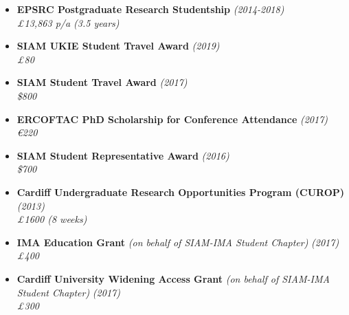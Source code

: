 \documentclass[11pt,a4paper,sans]{moderncv}        %
\begin{document}
\begin{itemize}

\item \textbf{EPSRC Postgraduate Research Studentship} \textit{(2014-2018)} \\
\textit{£13,863 p/a (3.5 years)}

\vspace{6pt}

\item \textbf{SIAM UKIE Student Travel Award} \textit{(2019)}\\
\textit{£80}

\vspace{6pt}

\item \textbf{SIAM Student Travel Award} \textit{(2017)}\\
\textit{\$800}

\vspace{6pt}

\item \textbf{ERCOFTAC PhD Scholarship for Conference Attendance} \textit{(2017)}\\
\textit{\euro{}220}

\vspace{6pt}

\item \textbf{SIAM Student Representative Award} \textit{(2016)}\\
\textit{\$700}

\vspace{6pt}

\item \textbf{Cardiff Undergraduate Research Opportunities Program (CUROP)} \textit{(2013)} \\
\textit{£1600 (8 weeks)}

\vspace{6pt}

\item \textbf{IMA Education Grant} \textit{(on behalf of SIAM-IMA Student Chapter)} \textit{(2017)}\\
\textit{£400}

\vspace{6pt}

\item \textbf{Cardiff University Widening Access Grant} \textit{(on behalf of SIAM-IMA Student Chapter)} \textit{(2017)}\\
\textit{£300}

\vspace{6pt}

\end{itemize}
\end{document}
